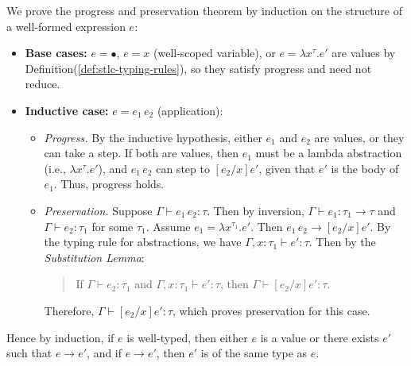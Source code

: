     \newpage 

\begin{Proof}

    We prove the progress and preservation theorem by induction on the structure of a well-formed expression $e$:

    \begin{itemize}
        \item \textbf{Base cases:} $e = \bullet$, $e = x$ (well-scoped variable), or $e = \lambda x^{\tau}. e'$ are values by Definition(\ref{def:stlc-typing-rules}), so they satisfy progress and need not reduce.

        \item \textbf{Inductive case:} $e = e_1\, e_2$ (application):

        \begin{itemize}
            \item \emph{Progress.} By the inductive hypothesis, either $e_1$ and $e_2$ are values, or they can take a step. 
            If both are values, then $e_1$ must be a lambda abstraction (i.e., $\lambda x^{\tau}. e'$), and $e_1\, e_2$ can step to $[e_2 / x]e'$, given that $e'$ is the body of $e_1$. Thus, progress holds.

            \item \emph{Preservation.} Suppose $\Gamma \vdash e_1\, e_2 : \tau$. Then by inversion, $\Gamma \vdash e_1 : \tau_1 \to \tau$ and $\Gamma \vdash e_2 : \tau_1$ for some $\tau_1$. Assume $e_1 = \lambda x^{\tau_1}. e'$. Then $e_1\, e_2 \rightarrow [e_2/x]e'$. By the typing rule for abstractions, we have $\Gamma, x : \tau_1 \vdash e' : \tau$. Then by the \emph{Substitution Lemma}:

            \begin{quote}
                If $\Gamma \vdash e_2 : \tau_1$ and $\Gamma, x:\tau_1 \vdash e' : \tau$, then $\Gamma \vdash [e_2/x]e' : \tau$.
            \end{quote}

            Therefore, $\Gamma \vdash [e_2/x]e' : \tau$, which proves preservation for this case.
        \end{itemize}
    \end{itemize}

    \noindent
    Hence by induction, if $e$ is well-typed, then either $e$ is a value or there exists $e'$ such that $e \rightarrow e'$, and if $e \rightarrow e'$, then $e'$ is of the same type as $e$.
\end{Proof}

